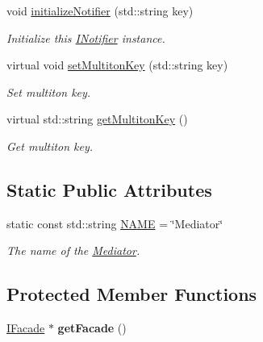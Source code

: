 \begin{DoxyCompactItemize}
\item 
void \hyperlink{class_pure_m_v_c_1_1_notifier_a6910365c70415ba7973401215f57e4af}{initializeNotifier} (std::string key)
\begin{DoxyCompactList}\small\item\em Initialize this \hyperlink{class_pure_m_v_c_1_1_i_notifier}{INotifier} instance. \item\end{DoxyCompactList}\item 
virtual void \hyperlink{class_pure_m_v_c_1_1_multiton_key_heir_abc70ef7c066bc8d7bf0196ec727599bb}{setMultitonKey} (std::string key)
\begin{DoxyCompactList}\small\item\em Set multiton key. \item\end{DoxyCompactList}\item 
virtual std::string \hyperlink{class_pure_m_v_c_1_1_multiton_key_heir_aa5622459d33380deb08dc3cab8b991c7}{getMultitonKey} ()
\begin{DoxyCompactList}\small\item\em Get multiton key. \item\end{DoxyCompactList}\end{DoxyCompactItemize}
\subsection*{Static Public Attributes}
\begin{DoxyCompactItemize}
\item 
static const std::string \hyperlink{class_pure_m_v_c_1_1_mediator_a4d72ca6cdea700a24c5c4bff7b4c31ce}{NAME} = \char`\"{}Mediator\char`\"{}
\begin{DoxyCompactList}\small\item\em The name of the {\ttfamily \hyperlink{class_pure_m_v_c_1_1_mediator}{Mediator}}. \item\end{DoxyCompactList}\end{DoxyCompactItemize}
\subsection*{Protected Member Functions}
\begin{DoxyCompactItemize}
\item 
\hypertarget{class_pure_m_v_c_1_1_notifier_a3eeda7190c0c0a2af8d34074df332bbe}{
\hyperlink{class_pure_m_v_c_1_1_i_facade}{IFacade} $\ast$ {\bfseries getFacade} ()}
\label{class_pure_m_v_c_1_1_notifier_a3eeda7190c0c0a2af8d34074df332bbe}

\end{DoxyCompactItemize}
